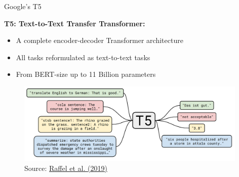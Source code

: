 \documentclass[]{beamer}
\begin{document}
\begin{frame}{Google's T5 \href{https://arxiv.org/pdf/1910.10683.pdf}{}}

	\textbf{T5: Text-to-Text Transfer Transformer:}

	\begin{itemize}
		\item A complete encoder-decoder Transformer architecture
		\item All tasks reformulated as text-to-text tasks
		\item From BERT-size up to 11 Billion parameters
	\end{itemize}
	
	\begin{figure}
		\centering
		\includegraphics[width = 11cm]{figure/t5.png}\\ 
		\footnotesize{Source:} \href{https://arxiv.org/pdf/1910.10683.pdf}{\footnotesize Raffel et al. (2019)}
	\end{figure}
\end{frame}
\end{document}
